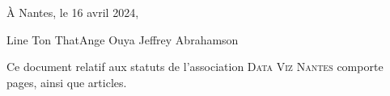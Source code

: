 \documentclass[12 pt]{article}
\newcommand{\quand}{16 avril 2024}
\newcommand{\Nom}{\textsc{Data Viz Nantes}}
\begin{document}
\vfill{}

\begin{flushright}
  À Nantes, le \quand{},
\end{flushright}

\vspace{10mm}

\hfill{}Line Ton That\hfill{}Ange Ouya \hspace{4cm} Jeffrey Abrahamson\hfill{}

\vspace{15mm}

Ce document relatif aux statuts de l'association \Nom{} comporte
\pageref{LastPage} pages, ainsi que  articles.

\vfill{}

\end{document}
